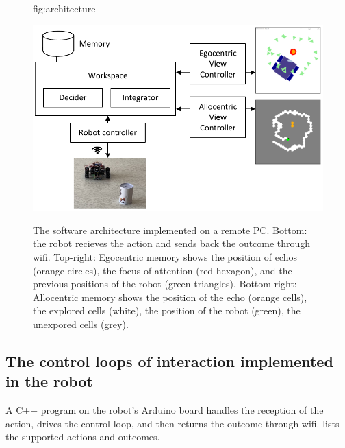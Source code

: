 \documentclass[pmlr]{jmlr}%
\begin{document}
\begin{figure}[htbp]
	\floatconts
	{fig:architecture}
	{\caption{The software architecture implemented on a remote PC. 
			Bottom: the robot recieves the action and sends back the outcome through wifi.
			Top-right: Egocentric memory shows the position of echos (orange circles), the focus of attention (red hexagon), and the previous positions of the robot (green triangles).
			Bottom-right: Allocentric memory shows the position of the echo (orange cells), the explored cells (white), the position of the robot (green), the unexpored cells (grey).}}
	{\includegraphics[width=0.7\linewidth]{images/Figure_2_Architecture}}
\end{figure}


\subsection{The control loops of interaction implemented in the robot}

A C++ program on the robot's Arduino board handles the reception of the action, drives the control loop, and then returns the outcome through wifi. 
 lists the supported actions and outcomes.
\end{document}
